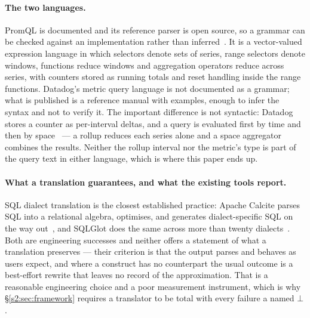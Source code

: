 \paragraph{The two languages.}
PromQL is documented and its reference parser is open source, so a grammar can be checked
against an implementation rather than inferred~\citep{promql}. It is a vector-valued
expression language in which selectors denote sets of series, range selectors denote
windows, functions reduce windows and aggregation operators reduce across series, with
counters stored as running totals and reset handling inside the range functions. Datadog's
metric query language is not documented as a grammar; what is published is a reference
manual with examples, enough to infer the syntax and not to verify it. The important
difference is not syntactic: Datadog stores a counter as per-interval deltas, and a query
is evaluated first by time and then by space~\citep{datadog,ddnested} --- a rollup reduces
each series alone and a space aggregator combines the results. Neither the rollup interval
nor the metric's type is part of the query text in either language, which is where this
paper ends up.

\paragraph{What a translation guarantees, and what the existing tools report.}
SQL dialect translation is the closest established practice: Apache Calcite parses SQL into
a relational algebra, optimises, and generates dialect-specific SQL on the way
out~\citep{begoli2018}, and SQLGlot does the same across more than twenty
dialects~\citep{sqlglot}. Both are engineering successes and neither offers a statement of
what a translation preserves --- their criterion is that the output parses and behaves as
users expect, and where a construct has no counterpart the usual outcome is a best-effort
rewrite that leaves no record of the approximation. That is a reasonable engineering choice
and a poor measurement instrument, which is why \S\ref{s2:sec:framework} requires a
translator to be total with every failure a named $\bot$.

